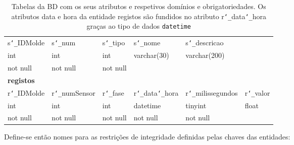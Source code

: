 \documentclass[11pt,twoside,a4paper]{report}
\begin{document}
\begin{table}[H]
\begin{tabular}{|l|l|l|l|l|l|}
		s\texttt{\char`_}IDMolde & s\texttt{\char`_}num & s\texttt{\char`_}tipo & s\texttt{\char`_}nome & s\texttt{\char`_}descricao & \multicolumn{1}{l}{}\\ \cline{1-5}
		int & int & int & varchar(30) & varchar(200) & \multicolumn{1}{l}{}\\ \cline{1-5}
		not null & not null & not null & & & \multicolumn{1}{l}{}\\ \cline{1-5}
		\multicolumn{6}{l}{\textbf{registos}}\\ \hline
		r\texttt{\char`_}IDMolde & r\texttt{\char`_}numSensor & r\texttt{\char`_}fase &  r\texttt{\char`_}data\texttt{\char`_}hora & r\texttt{\char`_}milissegundos & r\texttt{\char`_}valor\\ \hline
		int & int & int & datetime & tinyint & float\\ \hline
		not null & not null & not null & not null & not null & \\ \hline
	\end{tabular}
	\caption[Tabelas da BD com os seus atributos e respetivos domínios e obrigatoriedades]{Tabelas da BD com os seus atributos e respetivos domínios e obrigatoriedades. Os atributos data e hora da entidade registos são fundidos no atributo r\texttt{\char`_}data\texttt{\char`_}hora graças ao tipo de dados \texttt{datetime}}
	\label{tab:dominio}
\end{table}
Define-se então nomes para as restrições de integridade definidas pelas chaves das entidades:
\end{document}
